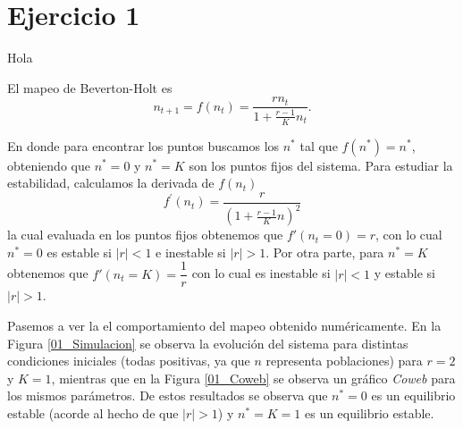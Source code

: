\section*{Ejercicio 1}
\graphicspath{{Figuras/ej_01/}}

Hola \cite{einstein}

El mapeo de Beverton-Holt es
\begin{equation}
    n_{t+1} = f(n_{t}) = \frac{rn_{t}}{1+\frac{r-1}{K}n_{t}}.
\end{equation}

En donde para encontrar los puntos buscamos los $n^{*}$ tal que $f(n^{*}) = n^{*}$, obteniendo que $n^{*} = 0$ y $n^{*} = K$ son los puntos fijos del sistema. Para estudiar la estabilidad, calculamos la derivada de $f(n_{t})$
\begin{equation}
    f^{'}(n_{t}) = \frac{r}{(1+\frac{r-1}{K}n)^{2}}
    \label{eq:Mapeo_Beverton-Holt}
\end{equation}
la cual evaluada en los puntos fijos obtenemos que $f'(n_{t}=0) = r$, con lo cual $n^{*}=0$ es estable si $|r|<1$ e inestable si $|r|>1$. Por otra parte, para $n^{*}=K$ obtenemos que $f'(n_{t}=K)=\dfrac{1}{r}$ con lo cual es inestable si $|r|<1$ y estable si $|r|>1$.

Pasemos a ver la el comportamiento del mapeo obtenido numéricamente. En la Figura \ref{01_Simulacion} se observa la evolución del sistema para distintas condiciones iniciales (todas positivas, ya que $n$ representa poblaciones) para $r=2$ y $K=1$, mientras que en la Figura \ref{01_Coweb} se observa un gráfico \textit{Coweb} para los mismos parámetros. De estos resultados se observa que $n^{*}=0$ es un equilibrio estable (acorde al hecho de que $|r|>1$) y $n^{*}=K=1$ es un equilibrio estable.

